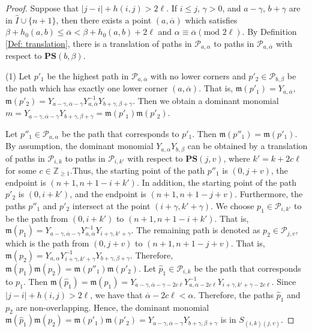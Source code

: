 \documentclass[12pt, reqno]{amsart}
\numberwithin{equation}{section}
\newcommand{\ZZ}{\mathbb{Z}}
\begin{document}
{\begin{proof}
Suppose that $|j-i|+h(i,j)>2 \ell$. If $i\leq j$, $\gamma>0$, and $a-\gamma$, $b+\gamma$ are in $\hat{I}\cup\{n+1\}$, then there exists a point $(a,\overline{\alpha})$ which satisfies $\beta+h_0(a,b)\leq \overline{\alpha}< \beta+h_0(a,b)+2 \ell$ and $\alpha \equiv \overline{\alpha} (\text{mod } 2 \ell)$. By Definition \ref{Def: translation}, there is a translation of paths in $\mathscr{P}_{a,\alpha}$ to paths in $\mathscr{P}_{a,\overline{\alpha}}$ with respect to $\mathbf{PS}(b,\beta)$.

(1) Let $p'_1$ be the highest path in $\mathscr{P}_{a,\overline{\alpha}}$ with no lower corners and $p'_2 \in \mathscr{P}_{b,\beta}$ be the path which has exactly one lower corner $(a, \overline{\alpha})$. That is, $\mathfrak{m}(p'_1)=Y_{a,\overline{\alpha}}$, $\mathfrak{m}(p'_2)=Y_{a-\gamma,\overline{\alpha}-\gamma}Y_{a,\overline{\alpha}}^{-1}Y_{b+\gamma,\beta+\gamma}$. Then we obtain a dominant monomial $m=Y_{a-\gamma,\overline{\alpha}-\gamma}Y_{b+\gamma,\beta+\gamma}=\mathfrak{m}(p'_1)\mathfrak{m}(p'_2)$.

Let $p''_1 \in \mathscr{P}_{a,{\alpha}}$ be the path that corresponds to $p'_1$. Then $\mathfrak{m}(p''_1)=\mathfrak{m}(p'_1)$. By assumption, the dominant monomial $Y_{a,\alpha}Y_{b,\beta}$ can be obtained by a translation of paths in $\mathscr{P}_{i,k}$ to paths in $\mathscr{P}_{i,k'}$ with respect to $\mathbf{PS}(j,v)$, where $k'=k+2c \ell$ for some $c\in\ZZ_{\geq 1}$.Thus, the starting point of the path $p''_1$ is $(0,j+v)$, the endpoint is $(n+1,n+1-i+k')$. In addition, the starting point of the path $p'_2$ is $(0,i+k')$, and the endpoint is $(n+1,n+1-j+v)$. Furthermore, the paths $p''_1$ and $p'_2$ intersect at the point $(i+\gamma,k'+\gamma)$. We choose $p_1\in \mathscr{P}_{i,k'}$ to be the path from $(0,i+k')$ to $(n+1,n+1-i+k')$. That is, $\mathfrak{m}(p_1)=Y_{a-\gamma,\overline{\alpha}-\gamma}Y_{a,\overline{\alpha}}^{-1}Y_{i+\gamma,k'+\gamma}$. The remaining path is denoted as $p_2\in \mathscr{P}_{j,v}$, which is the path from $(0,j+v)$ to $(n+1,n+1-j+v)$. That is, $\mathfrak{m}(p_2)=Y_{a,\alpha}Y_{i+\gamma,k'+\gamma}^{-1}Y_{b+\gamma,\beta+\gamma}$. Therefore, $\mathfrak{m}(p_1)\mathfrak{m}(p_2)=\mathfrak{m}(p''_1)\mathfrak{m}(p'_2)$. Let $\hat{p}_1\in \mathscr{P}_{i,k}$ be the path that corresponds to $p_1$. Then $\mathfrak{m}(\hat{p}_1)=\mathfrak{m}(p_1)=Y_{a-\gamma,\overline{\alpha}-\gamma-2c \ell }Y_{a,\overline{\alpha}-2c \ell }^{-1}Y_{i+\gamma,k'+\gamma-2c \ell}$.
Since $|j-i|+h(i,j)>2 \ell$, we have that $\overline{\alpha}-2c \ell<\alpha$. Therefore, the paths $\hat{p}_1$ and $p_2$ are non-overlapping. Hence, the dominant monomial
$\mathfrak{m}(\hat{p}_1)\mathfrak{m}(p_2)=\mathfrak{m}(p'_1)\mathfrak{m}(p'_2)=Y_{a-\gamma,\overline{\alpha}-\gamma}Y_{b+\gamma,\beta+\gamma}$
is in $S_{(i,k)(j,v)}$.


\end{proof}}
\end{document}
